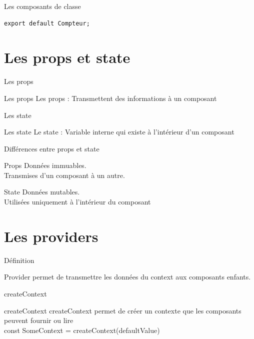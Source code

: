 \documentclass[5pt]{beamer}
\begin{document}
{\begin{frame}[fragile]{Les composants de classe}
\begin{block}{}
\begin{verbatim}
export default Compteur;
\end{verbatim}
\end{block}
\end{frame}





\section{Les props et state}
\begin{frame}[fragile]{ Les props}
\begin{block}{Les props }
Les props : Transmettent des informations à un composant
\end{block}
\end{frame}
\begin{frame}[fragile]{ Les state}
\begin{block}{Les state }
Le state : Variable interne qui existe à l’intérieur d’un
composant

\end{block}
\end{frame}
\begin{frame}[fragile]{ Différences entre props et state}
\begin{block}{Props }
Données immuables.\\
Transmises d’un composant à un autre.
\end{block}
\begin{block}{State }
Données mutables.\\
Utilisées uniquement à l’intérieur du composant
\end{block}
\end{frame}

\section{Les providers}
\begin{frame}[fragile]{ Définition}
\begin{block}{}
Provider permet de transmettre les données du context aux composants enfants.

\end{block}
\end{frame}
\begin{frame}[fragile]{ createContext}
\begin{block}{createContext }
createContext permet de créer un contexte que les composants peuvent fournir ou lire\\
const SomeContext = createContext(defaultValue)


\end{block}
\end{frame}}
\end{document}

